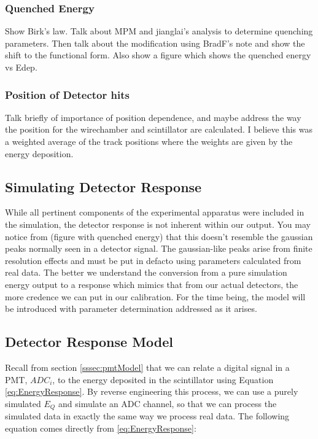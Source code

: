 \subsubsection{Quenched Energy} \label{sssec:Equenched}
Show Birk's law. Talk about MPM and jianglai's analysis to determine
quenching parameters. Then talk about the modification using BradF's note
and show the shift to the functional form. Also show a figure which shows
the quenched energy vs Edep.

\subsubsection{Position of Detector hits}
Talk briefly of importance of position dependence, and maybe address
the way the position for the wirechamber and scintillator are calculated.
I believe this was a weighted average of the track positions where the
weights are given by the energy deposition.

\subsection{Simulating Detector Response}
While all pertinent components of the experimental apparatus were included
in the simulation, the detector response is not inherent within our
output. You may notice from (figure with quenched energy) that this
doesn't resemble the gaussian peaks normally seen in a detector signal.
The gaussian-like peaks arise from finite resolution effects and
must be put in defacto using parameters calculated
from real data. The better we understand the conversion from a pure simulation
energy output to a response which mimics that from our actual detectors, the
more credence we can put in our calibration. For the time being, the model will
be introduced with parameter determination addressed as it arises. 

\subsection{Detector Response Model}

Recall from section \ref{sssec:pmtModel} that we can relate a digital signal
in a PMT, $ADC_i$, to the energy deposited in the scintillator
using Equation \ref{eq:EnergyResponse}.
By reverse engineering this process, we can use a purely simulated $E_Q$ and
simulate an ADC channel, so that we can process the simulated data in
exactly the same way we process real data. The following equation comes directly
from \ref{eq:EnergyResponse}:

